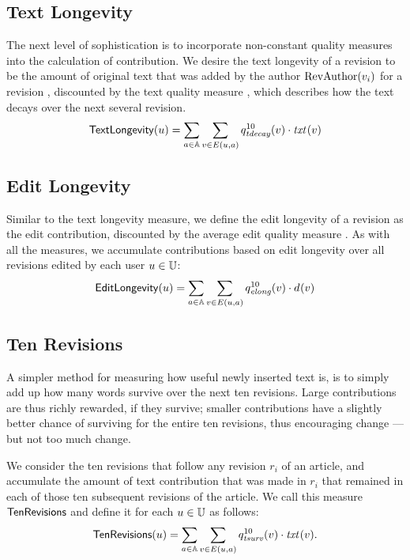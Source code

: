 \subsection{Text Longevity}

\noindent
The next level of sophistication is to incorporate
non-constant quality measures into the calculation of contribution.
We desire the text longevity of a revision to be
the amount of original text that was
added by the author $\mathrm{RevAuthor}(v_{i})$
for a revision , discounted by the
text quality measure , which describes
how the text decays over the next several revision.
%
\[
\textlong(u) = 
\sum_{a \in \articles} \sum_{v \in E(u, a)} \quality{tdecay}{10}{v}
        \cdot \txt{}{v}
\]
%

\subsection{Edit Longevity}

\noindent
Similar to the text longevity measure, we define the edit longevity
of a revision  as the edit contribution, discounted by the 
average edit quality measure .
As with all the measures, we accumulate contributions based on 
edit longevity over all revisions edited by each user $u \in \mathbb{U}$:
%
\[
\editlong(u) = \sum_{a \in \articles} \sum_{v \in E(u, a)} 
\quality{elong}{10}{v} \cdot \dist{}{v}
\]
%

\subsection{Ten Revisions}

\noindent
A simpler method for measuring how useful newly inserted
text is, is to simply add up how many words survive over
the next ten revisions.
Large contributions are thus richly rewarded, if they survive;
smaller contributions have a slightly better chance of surviving
for the entire ten revisions, thus encouraging change ---
but not too much change.

We consider the ten revisions that follow any revision $r_i$ of an 
article, and accumulate the amount of text contribution that was made 
in $r_i$ that remained in each of those ten subsequent revisions
of the article.
We call this measure $\tenrevs$ and define it for each
$u \in \mathbb{U}$ as follows:
%
\begin{gather*}
\tenrevs(u) = 
\sum_{a \in \articles} \sum_{v \in E(u, a)} \quality{tsurv}{10}{v}
        \cdot \txt{}{v}.
\end{gather*}

